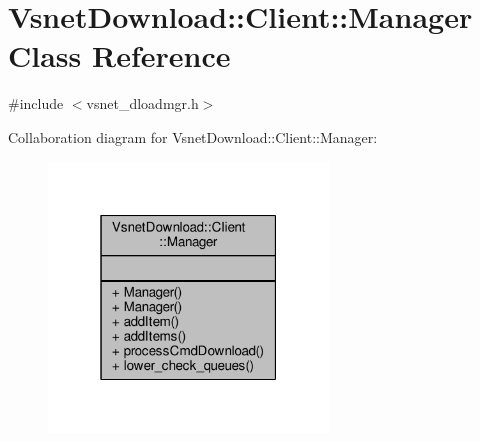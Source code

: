 \hypertarget{classVsnetDownload_1_1Client_1_1Manager}{}\section{Vsnet\+Download\+:\+:Client\+:\+:Manager Class Reference}
\label{classVsnetDownload_1_1Client_1_1Manager}


{\ttfamily \#include $<$vsnet\+\_\+dloadmgr.\+h$>$}



Collaboration diagram for Vsnet\+Download\+:\+:Client\+:\+:Manager\+:
\nopagebreak
\begin{figure}[H]
\begin{center}
\leavevmode
\includegraphics[width=211pt]{d3/d5b/classVsnetDownload_1_1Client_1_1Manager__coll__graph}
\end{center}
\end{figure}
